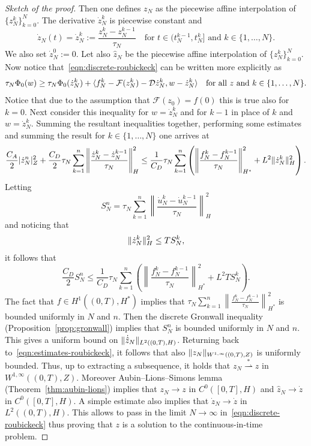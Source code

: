 \documentclass[a4paper,10pt,twoside]{amsbook}
\numberwithin{section}{chapter}
\numberwithin{equation}{chapter}
\theoremstyle{definition}
\DeclarePairedDelimiter{\norm}{\lVert}{\rVert}
\DeclarePairedDelimiter{\dual}{\langle}{\rangle}
\begin{document}
\begin{proof}[Sketch of the proof]
Then one defines $z_N$ as the piecewise affine interpolation of $\{z_N^k\}_{k=0}^N$. The derivative $\dot z_N^k$ is piecewise constant and
\[
\dot z_N(t)=\dot z_N^k:=\frac{z_N^k-z_N^{k-1}}{\tau_N}\quad\text{for $t\in(t_N^{k-1},t_N^k]$ and $k\in\{1,\dots,N\}$}.
\]
We also set $\dot z_N^0:=0$. Let also $\hat z_N$ be the piecewise affine interpolation of $\{z_N^k\}_{k=0}^N$. Now notice that~\eqref{eqn:discrete-roubickeck} can be written more explicitly as
\[
\tau_N\Phi_0(w)\ge\tau_N\Phi_0(\dot z_N^k)+\dual{f_N^k-\mathcal{F}(z_N^k)-\mathcal{D}\dot z_N^k,w-\dot z_N^k}\quad\text{for all $z$ and $k\in\{1,\dots,N\}$}.
\]
Notice that due to the assumption that $\mathcal{F}(z_0)=f(0)$ this is true also for $k=0$. Next consider this inequality for $w=\dot z_N^k$ and for $k-1$ in place of $k$ and $w=\dot z_N^k$. Summing the resultant inequalities together, performing some estimates and summing the result for $k\in\{1,\dots,N\}$ one arrives at
\begin{equation}
\label{eqn:estimates-roubickeck}
\frac{C_A}{2}|\dot z_N^n|_Z^2+\frac{C_D}{2}\tau_N\sum_{k=1}^n\left\lVert\frac{\dot z_N^k-\dot z_N^{k-1}}{\tau_N}\right\rVert_H^2\le\frac{1}{C_D}\tau_N\sum_{k=1}^n\left(\left\lVert\frac{f_N^k-f_N^{k-1}}{\tau_N}\right\rVert_{H^*}^2+L^2\norm{\dot z_N^k}_H^2\right).
\end{equation}
Letting
\[
S_N^n=\tau_N\sum_{k=1}^n\left\lVert\frac{\dot u_N^k-\dot u_N^{k-1}}{\tau_N}\right\rVert_H^2
\]
and noticing that
\[
\norm{\dot z_N^k}_H^2\le TS_N^k,
\]
it follows that
\[
\frac{C_D}{2}S_N^n\le\frac{1}{C_D}\tau_N\sum_{k=1}^n\left(\left\lVert\frac{f_N^k-f_N^{k-1}}{\tau_N}\right\rVert_{H^*}^2+L^2TS_N^k\right).
\]
The fact that $f\in H^1((0,T),H^*)$ implies that $\tau_N\sum_{k=1}^n\left\lVert\frac{f_N^k-f_N^{k-1}}{\tau_N}\right\rVert_{H^*}^2$ is bounded uniformly in $N$ and $n$. Then the discrete Gronwall inequality (Proposition~\ref{prop:gronwall}) implies that $S_N^n$ is bounded uniformly in $N$ and $n$. This gives a uniform bound on $\norm{\dot{\hat z}_N}_{L^2((0,T),H)}$. Returning back to~\eqref{eqn:estimates-roubickeck}, it follows that also $\norm{z_N}_{W^{1,\infty}((0,T),Z)}$ is uniformly bounded. Thus, up to extracting a subsequence, it holds that $z_N\overset{*}{\rightharpoonup}z$ in $W^{1,\infty}((0,T),Z)$. Moreover Aubin--Lions--Simons lemma (Theorem~\ref{thm:aubin-lions}) implies that $z_N\to z$ in $C^0([0,T],H)$ and $\hat{z}_N\to\dot z$ in $C^0([0,T],H)$. A simple estimate also implies that $\dot z_N\to\dot z$ in $L^2((0,T),H)$. This allows to pass in the limit $N\to\infty$ in~\eqref{eqn:discrete-roubickeck} thus proving that $z$ is a solution to the continuous-in-time problem.
\end{proof}
\end{document}
